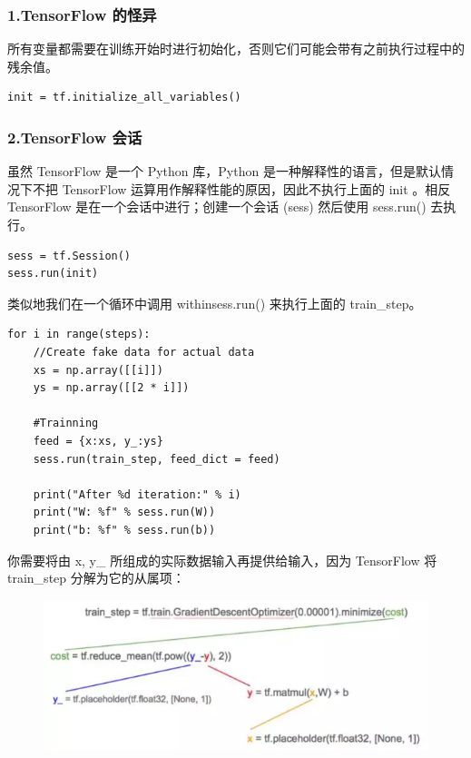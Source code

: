 \documentclass[11pt]{book} %
\begin{document}
\subsubsection{1.TensorFlow 的怪异}
所有变量都需要在训练开始时进行初始化，否则它们可能会带有之前执行过程中的残余值。

\begin{verbatim}
init = tf.initialize_all_variables()
\end{verbatim}

\subsubsection{2.TensorFlow 会话}
虽然 TensorFlow 是一个 Python 库，Python 是一种解释性的语言，但是默认情况下不把 TensorFlow 运算用作解释性能的原因，因此不执行上面的 init 。相反 TensorFlow 是在一个会话中进行；创建一个会话 (sess) 然后使用 sess.run() 去执行。

\begin{verbatim}
sess = tf.Session()
sess.run(init)
\end{verbatim}

类似地我们在一个循环中调用 withinsess.run() 来执行上面的 train\_step。

\begin{verbatim}
for i in range(steps):
    //Create fake data for actual data
    xs = np.array([[i]])
    ys = np.array([[2 * i]])
    
    #Trainning
    feed = {x:xs, y_:ys}
    sess.run(train_step, feed_dict = feed)
    
    print("After %d iteration:" % i)
    print("W: %f" % sess.run(W))
    print("b: %f" % sess.run(b))
\end{verbatim}

你需要将由 x, y\_ 所组成的实际数据输入再提供给输入，因为 TensorFlow 将 train\_step 分解为它的从属项：

\begin{figure}
\centering
\includegraphics[width=0.7\linewidth]{figures/train_steps}
\caption{}
\label{fig:trainsteps}
\end{figure}
\end{document}
